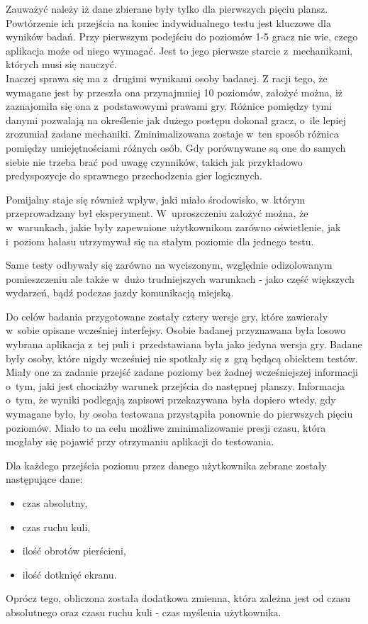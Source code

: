 \documentclass[a4paper,12pt,numbers=noenddot]{report}
\begin{document}
Zauważyć należy iż dane zbierane były tylko dla pierwszych pięciu plansz. Powtórzenie ich przejścia na koniec indywidualnego testu jest kluczowe dla wyników badań. Przy pierwszym podejściu do poziomów 1-5 gracz nie wie, czego aplikacja może od niego wymagać. Jest to jego pierwsze starcie z~mechanikami, których musi się nauczyć. \\
Inaczej sprawa się ma z~drugimi wynikami osoby badanej. Z racji tego, że wymagane jest by przeszła ona przynajmniej 10 poziomów, założyć można, iż zaznajomiła się ona z~podstawowymi prawami gry. Różnice pomiędzy tymi danymi pozwalają na określenie jak dużego postępu dokonał gracz, o~ile lepiej zrozumiał zadane mechaniki. Zminimalizowana zostaje w~ten sposób różnica pomiędzy umiejętnościami różnych osób. Gdy porównywane są one do samych siebie nie trzeba brać pod uwagę czynników, takich jak przykładowo predyspozycje do sprawnego przechodzenia gier logicznych.

Pomijalny staje się również wpływ, jaki miało środowisko, w~którym przeprowadzany był eksperyment. W~uproszczeniu założyć można, że w~warunkach, jakie były zapewnione użytkownikom zarówno oświetlenie, jak i~poziom hałasu utrzymywał się na stałym poziomie dla jednego testu.

Same testy odbywały się zarówno na wyciszonym, względnie odizolowanym pomieszczeniu ale także w~dużo trudniejszych warunkach - jako część większych wydarzeń, bądź podczas jazdy komunikacją miejską. 

Do celów badania przygotowane zostały cztery wersje gry, które zawierały w~sobie opisane wcześniej interfejsy. Osobie badanej przyznawana była losowo wybrana aplikacja z~tej puli i~przedstawiana była jako jedyna wersja gry. 
Badane były osoby, które nigdy wcześniej nie spotkały się z~grą będącą obiektem testów. Miały one za zadanie przejść zadane poziomy bez żadnej wcześniejszej informacji o~tym, jaki jest chociażby warunek przejścia do następnej planszy. Informacja o~tym, że wyniki podlegają zapisowi przekazywana była dopiero wtedy, gdy wymagane było, by osoba testowana przystąpiła ponownie do pierwszych pięciu poziomów. Miało to na celu możliwe zminimalizowanie presji czasu, która mogłaby się pojawić przy otrzymaniu aplikacji do testowania.

Dla każdego przejścia poziomu przez danego użytkownika zebrane zostały następujące dane:
\begin{itemize}
\item czas absolutny, 
\item czas ruchu kuli,
\item ilość obrotów pierścieni,
\item ilość dotknięć ekranu.
\end{itemize}
Oprócz tego, obliczona została dodatkowa zmienna, która zależna jest od czasu absolutnego oraz czasu ruchu kuli - czas myślenia użytkownika.
\end{document}
